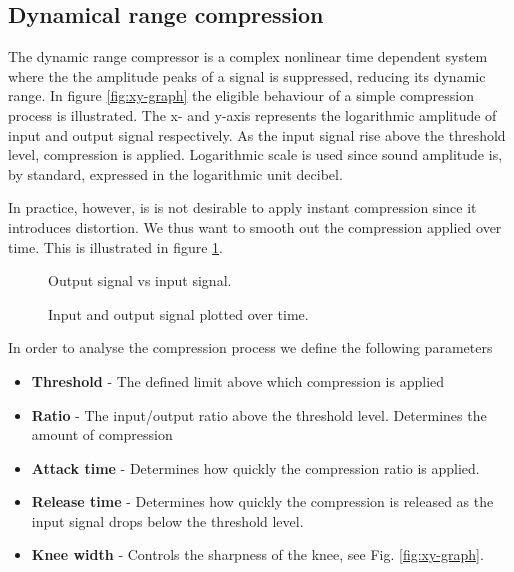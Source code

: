 \subsection{Dynamical range compression}
The dynamic range compressor is a complex nonlinear time dependent system where the the amplitude peaks of a signal is suppressed, reducing its dynamic range. In figure \ref{fig:xy-graph} the eligible behaviour of a simple compression process is illustrated. The x- and y-axis represents the logarithmic amplitude of input and output signal respectively. As the input signal rise above the threshold level, compression is applied. Logarithmic scale is used since sound amplitude is, by standard, expressed in the logarithmic unit decibel.

In practice, however, is is not desirable to apply instant compression since it introduces distortion\cite{giannoullis}. We thus want to smooth out the compression applied over time. This is illustrated in figure \ref{fig:envelope-graph}.

\begin{figure}[ht]
\captionsetup{justification=centering}
\begin{minipage}[t]{.5\textwidth}
 \centering

\caption{Output signal vs input signal.} 
\label{fig:xy-graph}
\end{minipage}%
\begin{minipage}[t]{.5\textwidth}
\centering

\caption{Input and output signal plotted over time. } 
\label{fig:envelope-graph}
\end{minipage}
\end{figure}

In order to analyse the compression process we define the following parameters
\begin{itemize}
\item{\textbf{Threshold} - The defined limit above which compression is applied }
\item{\textbf{Ratio} - The input/output ratio above the threshold level. Determines the amount of compression}
\item{\textbf{Attack time} - Determines how quickly the compression ratio is applied.}
\item{\textbf{Release time} - Determines how quickly the compression is released as the input signal drops below the threshold level.}
\item{\textbf{Knee width} - Controls the sharpness of the knee, see Fig. \ref{fig:xy-graph}.}
\end{itemize}



